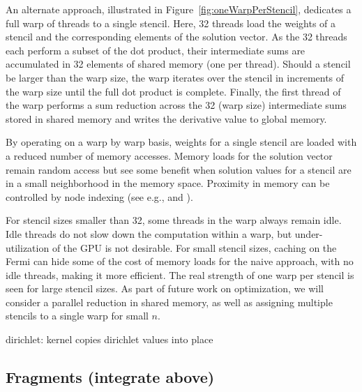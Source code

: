 An alternate approach, illustrated in Figure~\ref{fig:oneWarpPerStencil}, dedicates a full warp of threads to a single stencil. Here, 32 threads load the weights of a stencil and the corresponding elements of the solution vector. As the 32 threads each perform a subset of the dot product, their intermediate sums are accumulated in 32 elements of shared memory (one per thread).
Should  a stencil be larger than the warp size, the warp iterates over the stencil in increments of the warp size until the full dot product is complete. Finally, the first thread of the warp performs a sum reduction across the 32 (warp size)  intermediate sums stored in shared memory and writes the derivative value to global memory. 

By operating on a warp by warp basis, weights for a single stencil are loaded with a reduced number of memory accesses. Memory loads for the solution vector remain random access but see some benefit when solution values for a stencil are in a small neighborhood in the memory space. Proximity in memory can be controlled by node indexing (see e.g., \cite{Bollig2011} and \cite{Connor2009}). 

For stencil sizes smaller than 32, some threads in the warp always remain idle. Idle threads do not slow down the computation within a warp, but under-utilization of the GPU is not desirable. For small stencil sizes, caching on the Fermi can hide some of the cost of memory loads for the naive approach, with no idle threads, making it more efficient. The real strength of one warp per stencil is seen for large stencil sizes. 
As part of future work on optimization, we will consider a parallel reduction in shared memory, as well as assigning multiple stencils to a single warp for small  $n$. 



dirichlet: kernel copies dirichlet values into place 



\subsection{Fragments (integrate above)}



